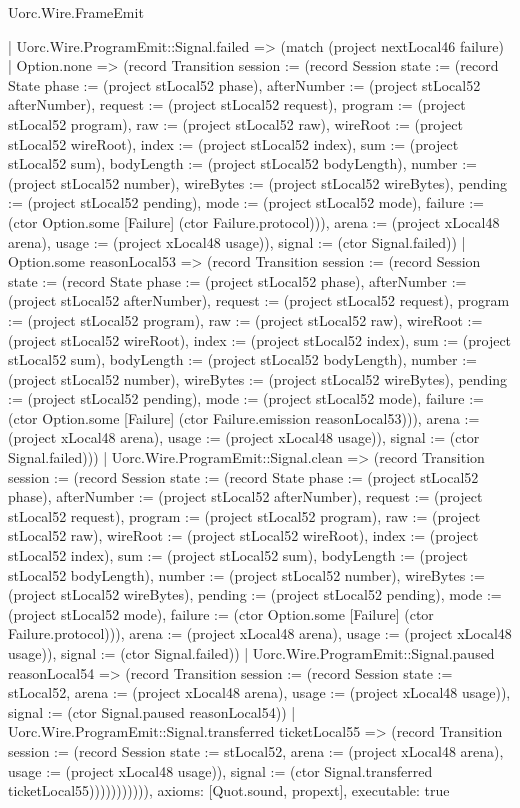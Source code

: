 \begin{lexlean}{Uorc.Wire.FrameEmit}
\begin{semanticmodule}
{        | Uorc.Wire.ProgramEmit::Signal.failed => (match (project nextLocal46 failure)
          | Option.none => (record Transition {session := (record Session {state := (record State {phase := (project stLocal52 phase), afterNumber := (project stLocal52 afterNumber), request := (project stLocal52 request), program := (project stLocal52 program), raw := (project stLocal52 raw), wireRoot := (project stLocal52 wireRoot), index := (project stLocal52 index), sum := (project stLocal52 sum), bodyLength := (project stLocal52 bodyLength), number := (project stLocal52 number), wireBytes := (project stLocal52 wireBytes), pending := (project stLocal52 pending), mode := (project stLocal52 mode), failure := (ctor Option.some [Failure] (ctor Failure.protocol))}), arena := (project xLocal48 arena), usage := (project xLocal48 usage)}), signal := (ctor Signal.failed)})
          | Option.some reasonLocal53 => (record Transition {session := (record Session {state := (record State {phase := (project stLocal52 phase), afterNumber := (project stLocal52 afterNumber), request := (project stLocal52 request), program := (project stLocal52 program), raw := (project stLocal52 raw), wireRoot := (project stLocal52 wireRoot), index := (project stLocal52 index), sum := (project stLocal52 sum), bodyLength := (project stLocal52 bodyLength), number := (project stLocal52 number), wireBytes := (project stLocal52 wireBytes), pending := (project stLocal52 pending), mode := (project stLocal52 mode), failure := (ctor Option.some [Failure] (ctor Failure.emission reasonLocal53))}), arena := (project xLocal48 arena), usage := (project xLocal48 usage)}), signal := (ctor Signal.failed)}))
        | Uorc.Wire.ProgramEmit::Signal.clean => (record Transition {session := (record Session {state := (record State {phase := (project stLocal52 phase), afterNumber := (project stLocal52 afterNumber), request := (project stLocal52 request), program := (project stLocal52 program), raw := (project stLocal52 raw), wireRoot := (project stLocal52 wireRoot), index := (project stLocal52 index), sum := (project stLocal52 sum), bodyLength := (project stLocal52 bodyLength), number := (project stLocal52 number), wireBytes := (project stLocal52 wireBytes), pending := (project stLocal52 pending), mode := (project stLocal52 mode), failure := (ctor Option.some [Failure] (ctor Failure.protocol))}), arena := (project xLocal48 arena), usage := (project xLocal48 usage)}), signal := (ctor Signal.failed)})
        | Uorc.Wire.ProgramEmit::Signal.paused reasonLocal54 => (record Transition {session := (record Session {state := stLocal52, arena := (project xLocal48 arena), usage := (project xLocal48 usage)}), signal := (ctor Signal.paused reasonLocal54)})
        | Uorc.Wire.ProgramEmit::Signal.transferred ticketLocal55 => (record Transition {session := (record Session {state := stLocal52, arena := (project xLocal48 arena), usage := (project xLocal48 usage)}), signal := (ctor Signal.transferred ticketLocal55)})))))))))),
  axioms: [Quot.sound, propext],
  executable: true
}


\end{semanticmodule}
\end{lexlean}
